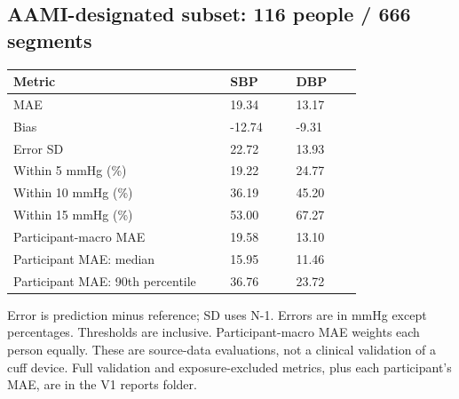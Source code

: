 \documentclass[11pt,letterpaper]{article}
\renewcommand{\arraystretch}{1.22}
\begin{document}
\subsection*{AAMI-designated subset: 116 people / 666 segments}
{\small\renewcommand{\arraystretch}{1.05}

\par\smallskip
\begin{tabular}{@{}p{0.57\linewidth}p{0.17\linewidth}p{0.17\linewidth}@{}}\toprule
Metric & SBP & DBP\\\midrule
MAE & 19.34 & 13.17\\
Bias & -12.74 & -9.31\\
Error SD & 22.72 & 13.93\\
Within 5 mmHg (\%) & 19.22 & 24.77\\
Within 10 mmHg (\%) & 36.19 & 45.20\\
Within 15 mmHg (\%) & 53.00 & 67.27\\
Participant-macro MAE & 19.58 & 13.10\\
Participant MAE: median & 15.95 & 11.46\\
Participant MAE: 90th percentile & 36.76 & 23.72\\
\bottomrule\end{tabular}\par\smallskip
}
Error is prediction minus reference; SD uses N-1. Errors are in mmHg except percentages. Thresholds are inclusive. Participant-macro MAE weights each person equally. These are source-data evaluations, not a clinical validation of a cuff device. Full validation and exposure-excluded metrics, plus each participant's MAE, are in the V1 reports folder.
\end{document}
